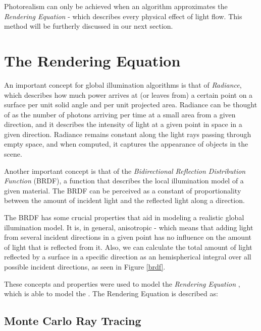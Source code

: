 Photorealism can only be achieved when an algorithm approximates the \textit{Rendering Equation} - which describes every physical effect of light flow. This method will be furtherly discussed in our next section. 

\section{The Rendering Equation}


An important concept for global illumination algorithms is that of \textit{Radiance}, which describes how much power arrives at (or leaves from) a certain point on a surface per unit solid angle and per unit projected area. Radiance can be thought of as the number of photons arriving per time at a small area from a given direction, and it describes the intensity of light at a given point in space in a given direction. Radiance remains constant along the light rays passing through empty space, and when computed, it captures the appearance of objects in the scene.

Another important concept is that of the \textit{Bidirectional Reflection Distribution Function} (BRDF), a function that describes the local illumination model of a given material. The BRDF can be perceived as a constant of proportionality between the amount of incident light and the reflected light along a direction.

The BRDF has some crucial properties that aid in modeling a realistic global illumination model. It is, in general, anisotropic - which means that adding light from several incident directions in a given point has no influence on the amount of light that is reflected from it. Also, we can calculate the total amount of light reflected by a surface in a specific direction as an hemispherical integral over all possible incident directions, as seen in Figure \ref{brdf}.

These concepts and properties were used to model the \textit{Rendering Equation} \cite{Kajiya:1986}, which is able to model the . The Rendering Equation is described as:

%  



\subsection{Monte Carlo Ray Tracing}


